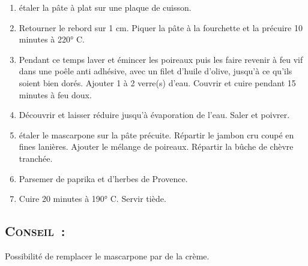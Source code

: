 \begin{enumerate}
\item \'etaler la p\^ate \`a plat sur une plaque de cuisson.

\item Retourner le rebord sur 1 cm. Piquer la p\^ate \`a la fourchette et la pr\'ecuire 10 minutes \`a 220° C.

\item Pendant ce temps laver et \'emincer les poireaux puis les faire revenir \`a feu vif dans une po\^ele anti adh\'esive, avec un filet d'huile d'olive, jusqu'\`a ce qu'ils soient bien dor\'es. Ajouter 1 \`a 2 verre(s) d'eau. Couvrir et cuire pendant 15 minutes \`a feu doux.
\item D\'ecouvrir et laisser r\'eduire jusqu'\`a \'evaporation de l'eau. Saler et poivrer.

\item \'etaler le mascarpone sur la p\^ate pr\'ecuite. R\'epartir le jambon cru coup\'e en fines lani\`eres. Ajouter le m\'elange de poireaux. R\'epartir la bûche de ch\`evre tranch\'ee. 

\item Parsemer de paprika et d'herbes de Provence.

\item Cuire 20 minutes \`a 190° C. Servir ti\`ede.

\end{enumerate}
\subsection*{\textsc{Conseil~:}}
Possibilit\'e de remplacer le mascarpone par de la cr\`eme.